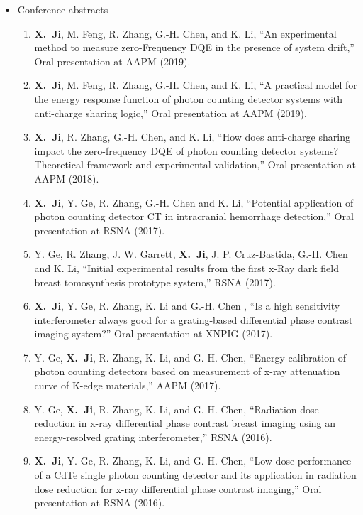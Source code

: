 \documentclass[letterpaper,11pt]{article}
\newcommand{\xji}{\textbf{X.~Ji}}
\begin{document}
\begin{itemize}
\item Conference abstracts 
\begin{enumerate}\justifying
\item \xji, M. Feng, R. Zhang, G.-H. Chen, and K. Li, ``An experimental method to measure zero-Frequency DQE in the presence of system drift,'' Oral presentation at AAPM (2019).

\item \xji, M. Feng, R. Zhang, G.-H. Chen, and K. Li, ``A practical model for the energy response function of photon counting detector systems with anti-charge sharing logic,'' Oral presentation at AAPM (2019).

\item \xji, R. Zhang, G.-H. Chen, and K. Li, ``How does anti-charge sharing impact the zero-frequency DQE of photon counting detector systems? Theoretical framework and experimental validation,'' Oral presentation at AAPM (2018).

\item \xji, Y. Ge, R. Zhang, G.-H. Chen and K. Li, ``Potential application of photon counting detector CT in intracranial hemorrhage detection,'' Oral presentation at RSNA (2017).

\item Y. Ge, R. Zhang, J. W. Garrett, \xji, J. P. Cruz-Bastida, G.-H. Chen and K. Li, ``Initial experimental results from the first x-Ray dark field breast tomosynthesis prototype system,'' RSNA (2017).

\item \xji, Y. Ge, R. Zhang, K. Li and G.-H. Chen , ``Is a high sensitivity interferometer always good for a grating-based differential phase contrast imaging system?'' Oral presentation at XNPIG (2017).

\item Y. Ge, \xji, R. Zhang, K. Li, and G.-H. Chen, ``Energy calibration of photon counting detectors based on measurement of x-ray attenuation curve of K-edge materials,'' AAPM (2017).

\item Y. Ge, \xji, R. Zhang, K. Li, and G.-H. Chen, ``Radiation dose reduction in x-ray differential phase contrast breast imaging using an energy-resolved grating interferometer,'' RSNA (2016).

\item \xji, Y. Ge, R. Zhang, K. Li, and G.-H. Chen, ``Low dose performance of a CdTe single photon counting detector and its application in radiation dose reduction for x-ray differential phase contrast imaging,'' Oral presentation at RSNA (2016).
\end{enumerate}
\end{itemize}
\end{document}
